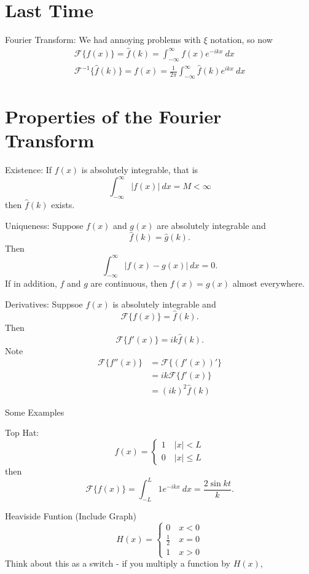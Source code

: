 \documentclass[cm]{article}
\renewcommand{\F}{\mathscr F}
\newcommand{\fhat}{\hat{f}}
\renewcommand{\infint}{\int_{-\infty}^{\infty}}
\newcommand{\ghat}{\hat{g}}
\begin{document}
\section{Last Time}
Fourier Transform: We had annoying problems with $\xi$ notation, so now
\begin{align*}
\F \{ f(x) \} = \fhat(k) = \int_{-\infty}^{\infty} f(x) e^{-ikx}~dx \\
\F^{-1} \{\fhat(k)\} = f(x) = \frac{1}{2\pi} \infint \fhat(k) e^{ikx}~dx
\end{align*}

\section{Properties of the Fourier Transform}
\enum
    \item Existence: If $f(x)$ is absolutely integrable, that is
    $$ \infint |f(x)|~dx = M < \infty$$
    then $\fhat(k)$ exists.
    \item Uniqueness: Suppose $f(x)$ and $g(x)$ are absolutely integrable and
    $$\fhat(k) = \ghat(k).$$
    Then
    $$\infint |f(x) - g(x)|~dx = 0.$$
    If in addition, $f$ and $g$ are continuous, then $f(x) = g(x)$ almost
    everywhere.
    \item Derivatives: Suppsoe $f(x)$ is absolutely integrable and
    $$\F\{f(x)\} = \fhat(k).$$
    Then
    $$\F\{f'(x)\} = ik \fhat(k).$$
    Note
    \begin{align*}
        \F\{f''(x)\} &= \F\{(f'(x))'\} \\
            &= ik \F\{f'(x)\} \\
            &= (ik)^2 \fhat(k)
    \end{align*}
    \item Some Examples
        \enum
            \item Top Hat:
            $$f(x) = \begin{cases} 1 \quad |x| < L \\ 0 \quad |x| \leq L
            \end{cases}$$
            then
            $$\F\{f(x)\} = \int_{-L}^L 1 e^{-ikx}~dx =  \frac{2 \sin kt}{k}.$$
            \item Heaviside Funtion (Include Graph)
            $$H(x) = \begin{cases} 0 \quad x < 0 \\ \frac12 \quad x = 0 \\ 1 \quad x > 0
            \end{cases}$$
            Think about this as a switch - if you multiply a function by $H(x)$,
\end{document}
